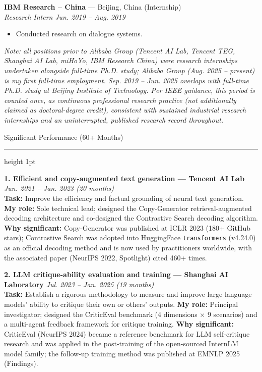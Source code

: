 \documentclass[10.5pt]{article}
\newcommand{\cvsection}[1]{%
  \vspace{10pt}
  {\color{accent}\headingfont\Large #1}\par
  \vspace{2pt}
  {\color{accent}\hrule height 1pt}
  \vspace{6pt}
}
\begin{document}
\vspace{4pt}
\textbf{IBM Research -- China} --- Beijing, China {\small\color{muted}(Internship)}\\
\textit{Research Intern} \hfill \textit{Jun. 2019 -- Aug. 2019}
\begin{itemize}
  \item Conducted research on dialogue systems.
\end{itemize}

\vspace{2pt}
{\small\color{muted}\itshape Note: all positions prior to Alibaba Group (Tencent AI Lab, Tencent TEG, Shanghai AI Lab, miHoYo, IBM Research China) were research internships undertaken alongside full-time Ph.D. study; Alibaba Group (Aug. 2025 -- present) is my first full-time employment. Sep. 2019 -- Jun. 2025 overlaps with full-time Ph.D. study at Beijing Institute of Technology. Per IEEE guidance, this period is counted once, as continuous professional research practice (not additionally claimed as doctoral-degree credit), consistent with sustained industrial research internships and an uninterrupted, published research record throughout.}

\cvsection{Significant Performance (60+ Months)}

\textbf{1. Efficient and copy-augmented text generation --- Tencent AI Lab} \hfill \textit{Jun. 2021 -- Jan. 2023 (20 months)}\\
\textbf{Task:} Improve the efficiency and factual grounding of neural text generation.
\textbf{My role:} Sole technical lead; designed the Copy-Generator retrieval-augmented decoding architecture and co-designed the Contrastive Search decoding algorithm.
\textbf{Why significant:} Copy-Generator was published at ICLR 2023 (180+ GitHub stars); Contrastive Search was adopted into HuggingFace \texttt{transformers} (v4.24.0) as an official decoding method and is now used by practitioners worldwide, with the associated paper (NeurIPS 2022, Spotlight) cited 460+ times.

\vspace{6pt}
\textbf{2. LLM critique-ability evaluation and training --- Shanghai AI Laboratory} \hfill \textit{Jul. 2023 -- Jan. 2025 (19 months)}\\
\textbf{Task:} Establish a rigorous methodology to measure and improve large language models' ability to critique their own or others' outputs.
\textbf{My role:} Principal investigator; designed the CriticEval benchmark (4 dimensions $\times$ 9 scenarios) and a multi-agent feedback framework for critique training.
\textbf{Why significant:} CriticEval (NeurIPS 2024) became a reference benchmark for LLM self-critique research and was applied in the post-training of the open-sourced InternLM model family; the follow-up training method was published at EMNLP 2025 (Findings).
\end{document}
